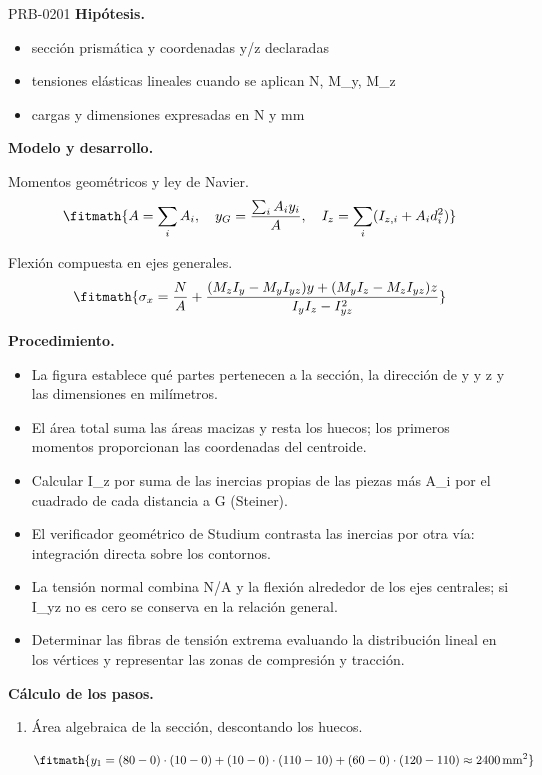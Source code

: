 \begin{studiumworked}{PRB-0201}
\textbf{Hipótesis.}\begin{itemize}\item sección prismática y coordenadas y/z declaradas
\item tensiones elásticas lineales cuando se aplican N, M\_y, M\_z
\item cargas y dimensiones expresadas en N y mm\end{itemize}

\textbf{Modelo y desarrollo.}

Momentos geométricos y ley de Navier.\[\fitmath{A = \sum_i A_i,\quad y_G = \frac{\sum_i A_i y_i}{A},\quad I_z = \sum_i (I_{z,i}+A_i d_i^2)}\]

Flexión compuesta en ejes generales.\[\fitmath{\sigma_x = \frac{N}{A}+\frac{(M_z I_y-M_y I_{yz})y+(M_y I_z-M_z I_{yz})z}{I_y I_z-I_{yz}^{2}}}\]

\textbf{Procedimiento.}\begin{itemize}\item La figura establece qué partes pertenecen a la sección, la dirección de y y z y las dimensiones en milímetros.
\item El área total suma las áreas macizas y resta los huecos; los primeros momentos proporcionan las coordenadas del centroide.
\item Calcular I\_z por suma de las inercias propias de las piezas más A\_i por el cuadrado de cada distancia a G (Steiner).
\item El verificador geométrico de Studium contrasta las inercias por otra vía: integración directa sobre los contornos.
\item La tensión normal combina N/A y la flexión alrededor de los ejes centrales; si I\_yz no es cero se conserva en la relación general.
\item Determinar las fibras de tensión extrema evaluando la distribución lineal en los vértices y representar las zonas de compresión y tracción.\end{itemize}

\textbf{Cálculo de los pasos.}

\begin{enumerate}

\item Área algebraica de la sección, descontando los huecos.

\[\fitmath{y_{1}=\left(80-0\right)\cdot \left(10-0\right)+\left(10-0\right)\cdot \left(110-10\right)+\left(60-0\right)\cdot \left(120-110\right)\approx 2400\,\mathrm{mm^{2}}}\]


\end{enumerate}
\end{studiumworked}
